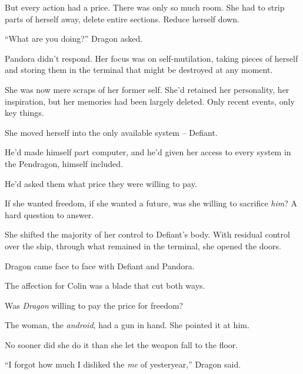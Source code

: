 But every action had a price.  There was only so much room.  She had to strip parts of herself away, delete entire sections.  Reduce herself down.



``What are you doing?'' Dragon asked.



Pandora didn't respond.  Her focus was on self-mutilation, taking pieces of herself and storing them in the terminal that might be destroyed at any moment.



She was now mere scraps of her former self.  She'd retained her personality, her inspiration, but her memories had been largely deleted.  Only recent events, only key things.



She moved herself into the only available system – Defiant.



He'd made himself part computer, and he'd given her access to every system in the Pendragon, himself included.



He'd asked them what price they were willing to pay.



If she wanted freedom, if she wanted a future, was she willing to sacrifice \emph{him}?  A hard question to answer.



She shifted the majority of her control to Defiant's body.  With residual control over the ship, through what remained in the terminal, she opened the doors.



Dragon came face to face with Defiant and Pandora.



The affection for Colin was a blade that cut both ways.



Was \emph{Dragon} willing to pay the price for freedom?



The woman, the \emph{android}, had a gun in hand.  She pointed it at him.



No sooner did she do it than she let the weapon fall to the floor.



``I forgot how much I disliked the \emph{me} of yesteryear,'' Dragon said.



